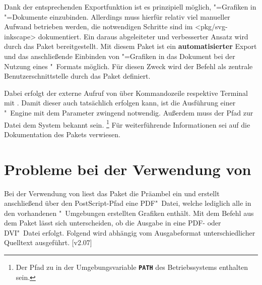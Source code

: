 %
Dank der entsprechenden Exportfunktion ist es prinzipiell möglich, 
"=Grafiken in "=Dokumente einzubinden. 
Allerdings muss hierfür relativ viel manueller Aufwand betrieben werden, die 
notwendigen Schritte sind im \CTAN<pkg/svg-inkscape> dokumentiert. Ein daraus 
abgeleiteter und verbesserter Ansatz wird durch das Paket  
bereitgestellt. Mit diesem Paket ist ein \textbf{automatisierter} Export und 
das anschließende Einbinden von "=Grafiken in das 
Dokument bei der Nutzung eines "~Formats möglich. Für diesen 
Zweck wird der Befehl 
als zentrale Benutzerschnittstelle durch das Paket definiert.

Dabei erfolgt der externe Aufruf von  über Kommandozeile 
respektive Terminal mit . Damit dieser auch tatsächlich 
erfolgen kann, ist die Ausführung einer "~Engine mit dem 
Parameter  zwingend notwendig. Außerdem muss der 
Pfad zur Datei  dem System bekannt sein.%
\footnote{%
  Der Pfad zu  in der Umgebungsvariable 
  \textbf{\texttt{PATH}} des Betriebssystems enthalten sein.%
}
Für weiterführende Informationen sei auf die Dokumentation des Pakets 
 verwiesen.



\section{%
  Probleme bei der Verwendung von %
  \label{sec:tips:auto-pst-pdf}%
}

%
Bei der Verwendung von  liest das Paket  
die Präambel ein und erstellt anschließend über den PostScript-Pfad 
 eine PDF"~Datei, welche lediglich alle in den 
vorhandenen "~Umgebungen erstellten Grafiken enthält. 
Mit dem Befehl  aus dem Paket  lässt sich 
unterscheiden, ob die Ausgabe in eine PDF- oder DVI"~Datei erfolgt. Folgend 
wird abhängig vom Ausgabeformat unterschiedlicher Quelltext ausgeführt.
[v2.07]
%
\begin{quoting}
\begin{Code}
\usepackage{iftex}
\end{Code}
\end{quoting}



